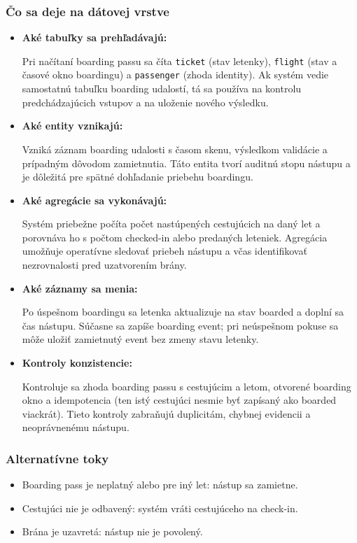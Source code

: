 \documentclass[11pt, a4paper]{article}
\begin{document}
\subsubsection*{Čo sa deje na dátovej vrstve}
\begin{itemize}
    \item \textbf{Aké tabuľky sa prehľadávajú:} 
    
    Pri načítaní boarding passu sa číta \texttt{ticket} (stav letenky), \texttt{flight} (stav a časové okno boardingu) a \texttt{passenger} (zhoda identity). Ak systém vedie samostatnú tabuľku boarding udalostí, tá sa používa na kontrolu predchádzajúcich vstupov a na uloženie nového výsledku.
    
    \item \textbf{Aké entity vznikajú:} 
    
    Vzniká záznam boarding udalosti s časom skenu, výsledkom validácie a prípadným dôvodom zamietnutia. Táto entita tvorí auditnú stopu nástupu a je dôležitá pre spätné dohľadanie priebehu boardingu.
    
    \item \textbf{Aké agregácie sa vykonávajú:} 
    
    Systém priebežne počíta počet nastúpených cestujúcich na daný let a porovnáva ho s počtom checked-in alebo predaných leteniek. Agregácia umožňuje operatívne sledovať priebeh nástupu a včas identifikovať nezrovnalosti pred uzatvorením brány.
    
    \item \textbf{Aké záznamy sa menia:} 
    
    Po úspešnom boardingu sa letenka aktualizuje na stav boarded a doplní sa čas nástupu. Súčasne sa zapíše boarding event; pri neúspešnom pokuse sa môže uložiť zamietnutý event bez zmeny stavu letenky.
    
    \item \textbf{Kontroly konzistencie:} 
    
    Kontroluje sa zhoda boarding passu s cestujúcim a letom, otvorené boarding okno a idempotencia (ten istý cestujúci nesmie byť zapísaný ako boarded viackrát). Tieto kontroly zabraňujú duplicitám, chybnej evidencii a neoprávnenému nástupu.
\end{itemize}

\subsubsection*{Alternatívne toky}
\begin{itemize}
    \item Boarding pass je neplatný alebo pre iný let: nástup sa zamietne.
    \item Cestujúci nie je odbavený: systém vráti cestujúceho na check-in.
    \item Brána je uzavretá: nástup nie je povolený.
\end{itemize}
\end{document}
